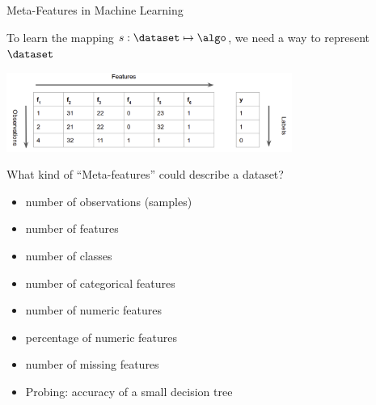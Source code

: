 \begin{frame}[c]{Meta-Features in Machine Learning}
	
To learn the mapping $s: \dataset \mapsto \algo$, we need a way to represent $\dataset$

\begin{center}
	\includegraphics[width=0.7\textwidth]{images/ml_data}
\end{center}


What kind of ``Meta-features'' could describe a dataset? \hands

\pause
\begin{itemize}
	\item number of observations (samples)
	\item number of features
	\item number of classes
	\item number of categorical features
	\item number of numeric features
	\item percentage of numeric features
	\item number of missing features
	\item Probing: accuracy of a small decision tree
\end{itemize}
	
	
\end{frame}
